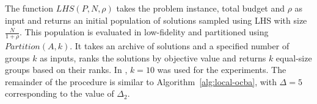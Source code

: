 The function $LHS(P,N,\rho)$ takes the problem instance, total budget and $\rho$ as input and returns an initial population of solutions sampled using LHS with size $\frac{N}{1+\rho}$. This population is evaluated in low-fidelity and partitioned using $Partition(A,k)$. It takes an archive of solutions and a specified number of groups $k$ as inputs, ranks the solutions by objective value and returns $k$ equal-size groups based on their ranks. In \cite{xu2016mo2tos}, $k=10$ was used for the experiments. The remainder of the procedure is similar to Algorithm~\ref{alg:local-ocba}, with $\Delta = 5$ corresponding to the value of $\Delta_2$.